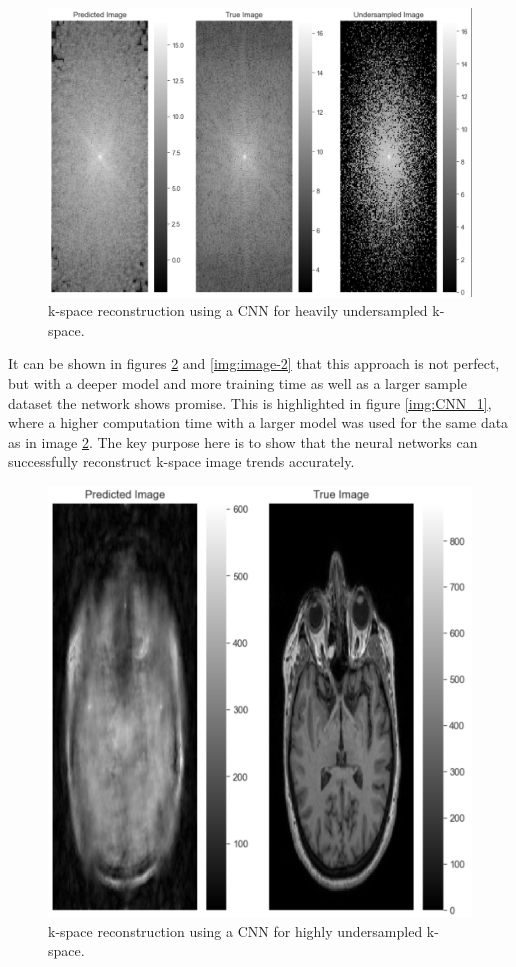 \documentclass[14pt]{extreport}
\begin{document}
        \begin{figure}[h]
            \centering
            \includegraphics[width=0.75\linewidth]{Kspace-2.png}
            \caption{k-space reconstruction using a CNN for heavily undersampled k-space.}
            \label{img:kspace-2}
        \end{figure}

        It can be shown in figures \ref{img:image-1} and \ref{img:image-2} that this approach is not perfect, but with a deeper model and more training time as well as a larger sample dataset the network shows promise. This is highlighted in figure \ref{img:CNN_1}, where a higher computation time with a larger model was used for the same data as in image \ref{img:image-1}. The key purpose here is to show that the neural networks can successfully reconstruct k-space image trends accurately.

        \begin{figure}[h]
            \centering
            \includegraphics[width=0.5\linewidth]{Image_2.png}
            \caption{k-space reconstruction using a CNN for highly undersampled k-space.}
            \label{img:image-1}
        \end{figure}
\end{document}
